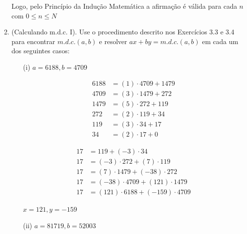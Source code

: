 \begin{enumerate}[label=3.\arabic*.]
    Logo, pelo Princípio da Indução Matemática a afirmação é válida para cada $n$ com $0 \leq n \leq N$
    
    \item (Calculando m.d.c. I). Use o procedimento descrito nos Exercícios 3.3 e 3.4 para 
    encontrar $m.d.c.(a,b)$ e resolver $ax + by = m.d.c.(a,b)$ em cada um dos seguintes casos:
    \begin{itemize}
        \item[(i)] $a = 6188, b = 4709$
        
        \begin{minipage}[t]{0.4\linewidth}
            \begin{align*}
                6188 &= (1)\cdot 4709 + 1479 \\
                4709 &= (3)\cdot 1479 + 272 \\
                1479 &= (5)\cdot 272 + 119 \\
                272 &= (2)\cdot 119 + 34 \\
                119 &= (3)\cdot 34 + 17 \\
                34 &= (2)\cdot 17 + 0
            \end{align*}
        \end{minipage}\hfill
        \begin{minipage}[t]{0.6\linewidth}
            \begin{align*}
                17 &= 119 + (-3)\cdot 34 \\
                17 &= (-3)\cdot 272 + (7)\cdot 119 \\
                17 &= (7)\cdot 1479 + (-38)\cdot 272 \\
                17 &= (-38)\cdot 4709 + (121)\cdot 1479 \\
                17 &= (121)\cdot 6188 + (-159)\cdot 4709
            \end{align*}
        \end{minipage}

        $\boxed{x = 121, y = -159}$

        \item[(ii)] $a = 81719, b = 52003$
        

\end{itemize}
\end{enumerate}
